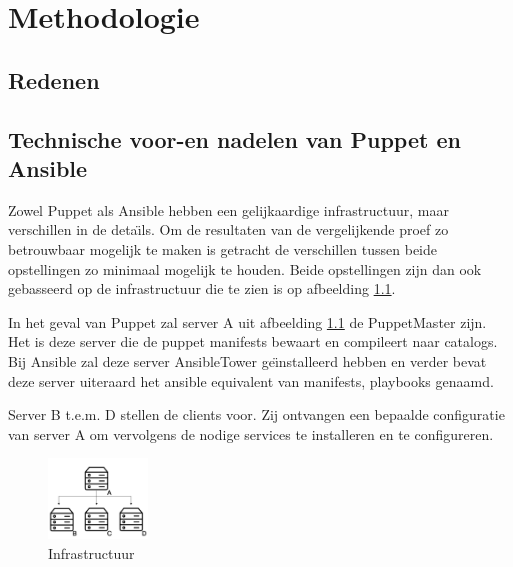 
\chapter{Methodologie}
\label{ch:methodologie}

\section{Redenen}
\label{sec:Redenen}

\section{ Technische voor-en nadelen van Puppet en Ansible}
\label{sec: technische-voor-en-nadelen-van-Puppet-en-Ansible}
Zowel Puppet als Ansible hebben een gelijkaardige infrastructuur, maar verschillen in de deta{\"\i}ls. Om de resultaten van de vergelijkende proef zo betrouwbaar mogelijk te maken is getracht de verschillen tussen beide opstellingen zo minimaal mogelijk te houden. Beide opstellingen zijn dan ook gebasseerd op de infrastructuur die te zien is op afbeelding \ref{fig:infrastructuur}.

In het geval van Puppet zal server A uit afbeelding \ref{fig:infrastructuur} de PuppetMaster zijn. Het is deze server die de puppet manifests bewaart en compileert naar catalogs. Bij Ansible zal deze server AnsibleTower ge{\"\i}nstalleerd hebben en verder bevat deze server uiteraard het ansible equivalent van manifests, playbooks genaamd. 

Server B t.e.m. D stellen de clients voor. Zij ontvangen een bepaalde configuratie van server A om vervolgens de nodige services te installeren en te configureren.

\begin{figure}
  \includegraphics[width=100px]{img/infrastructruur.png}
  \caption{Infrastructuur}
  \label{fig:infrastructuur}
\end{figure}

